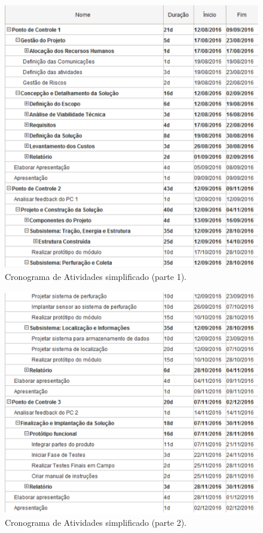 \begin{figure}[!htbp]
\begin{center}
\includegraphics[width=\textwidth]{figuras/cronograma_simples_1.eps}
\caption{\label{fig:cron_s1}Cronograma de Atividades simplificado (parte 1).}
\end{center}
\end{figure}

\begin{figure}[!htbp]
\begin{center}
\includegraphics[width=\textwidth]{figuras/cronograma_simples_2.eps}
\caption{\label{fig:cron_s2}Cronograma de Atividades simplificado (parte 2).}
\end{center}
\end{figure}

